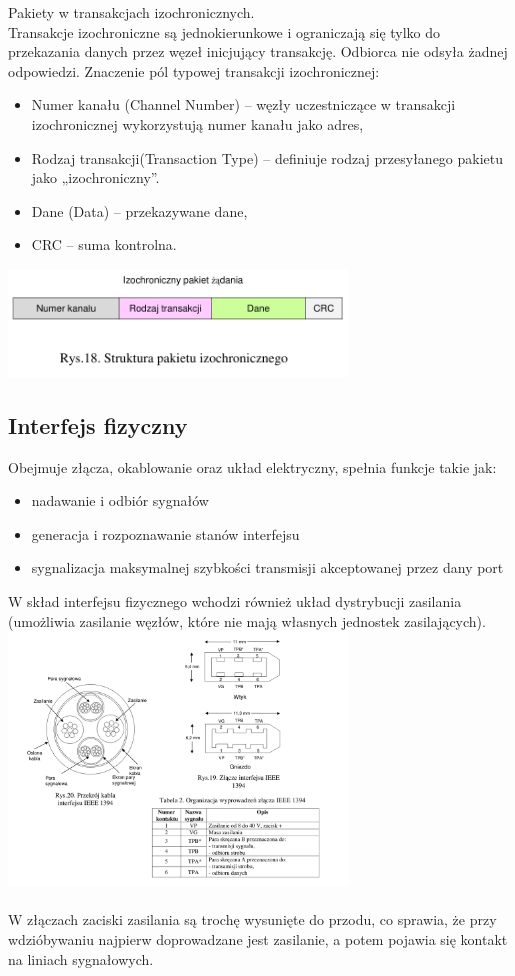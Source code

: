 	Pakiety w transakcjach izochronicznych.\\
	Transakcje izochroniczne są jednokierunkowe i ograniczają się tylko do przekazania danych przez węzeł inicjujący transakcję. Odbiorca nie odsyła żadnej odpowiedzi. Znaczenie pól typowej transakcji izochronicznej:
	\begin{itemize}
		\item Numer kanału (Channel Number) – węzły uczestniczące w transakcji izochronicznej wykorzystują numer kanału jako adres,
		\item Rodzaj transakcji(Transaction Type) – definiuje rodzaj przesyłanego pakietu jako „izochroniczny”.
		\item Dane (Data) – przekazywane dane,
		\item CRC – suma kontrolna.
	\end{itemize}
	\includegraphics[width=9cm]{./wyklady/FIREWIRE_20_1.pdf}
	
	
\subsection{Interfejs fizyczny}
Obejmuje złącza, okablowanie  oraz układ elektryczny, spełnia funkcje takie jak:
\begin{itemize}
	\item nadawanie i odbiór sygnałów
	\item generacja i rozpoznawanie stanów interfejsu
	\item sygnalizacja maksymalnej szybkości transmisji akceptowanej przez dany port
\end{itemize}
W skład interfejsu fizycznego wchodzi również układ dystrybucji zasilania (umożliwia zasilanie węzłów, które nie mają własnych jednostek zasilających).\\
\includegraphics[width=9cm]{./wyklady/FIREWIRE_21_1.pdf}\\\\
W złączach zaciski zasilania są trochę wysunięte do przodu, co sprawia, że przy wdzióbywaniu najpierw doprowadzane jest zasilanie, a potem pojawia się kontakt na liniach sygnałowych.

